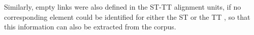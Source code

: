 \documentclass[output=paper]{LSP/langsci}
\begin{document}

       

Similarly, empty links were also defined in the ST-TT alignment units, if no corresponding element could be identified for either the ST or the TT \citep{Culo2012}, so that this information can also be extracted from the corpus.    
\end{document}

